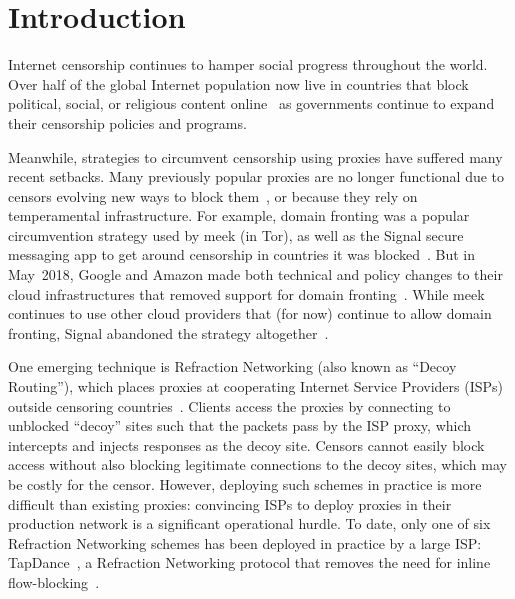 \documentclass[letterpaper,twocolumn,10pt]{article}
\begin{document}
\section{Introduction}



Internet censorship continues to hamper social progress throughout the world.
Over half of the global Internet population
now live in countries that block political, social, or religious content
online~\cite{fotn2018} as governments continue to expand their censorship
policies and programs.


Meanwhile, strategies to circumvent censorship using proxies have suffered many
recent setbacks. Many previously popular proxies are no longer functional due to
censors evolving new ways to block them~\cite{ensafi-tor,great-cannon},
or because they rely on temperamental
infrastructure. For example, domain fronting was a popular circumvention
strategy used by meek (in Tor), as well as the Signal secure messaging app to
get around censorship in countries it was
blocked~\cite{domain-fronting,signal,signal-domain-fronting}.
But in May~2018, Google and Amazon made both technical and policy changes to
their cloud infrastructures that removed support for domain
fronting~\cite{aws-front}. While meek
continues to use other cloud providers that (for now) continue to allow domain
fronting, Signal abandoned the strategy altogether~\cite{signal-back-on-front}.


One emerging technique is Refraction Networking (also known as ``Decoy
Routing''), which places proxies at cooperating Internet Service Providers
(ISPs) outside censoring countries~\cite{refraction-site}. Clients access the
proxies by connecting to unblocked ``decoy'' sites such that the packets pass by
the ISP proxy, which intercepts and injects responses as the decoy site.
Censors cannot easily block access without also blocking
legitimate connections to the decoy sites, which may be costly for the censor.
However, deploying such schemes in practice is more difficult than existing proxies:
convincing ISPs to deploy proxies in their production network is a significant
operational hurdle. To date, only one of six Refraction
Networking schemes has been deployed in practice by a large ISP:
TapDance~\cite{tadance}, a
Refraction Networking protocol that removes the need for inline
flow-blocking~\cite{frolov2017isp}.
\end{document}
